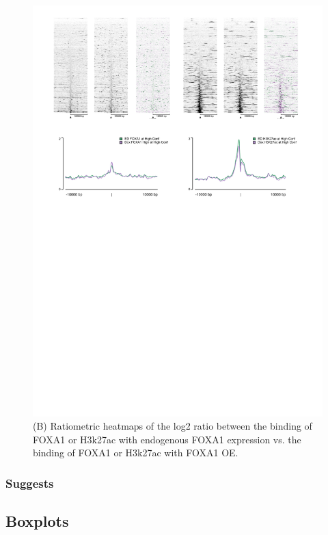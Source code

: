 \documentclass[
  12pt,
]{article}
\begin{document}
\begin{figure}

{\centering \includegraphics[width=24.54in]{../images/results_01} 

}

\caption{(B) Ratiometric heatmaps of the log2 ratio between the binding of FOXA1 or H3k27ac with endogenous FOXA1 expression vs. the binding of FOXA1 or H3k27ac with FOXA1 OE.}\label{fig:results-1}
\end{figure}

\hypertarget{suggests}{%
\subsubsection{Suggests}\label{suggests}}

\hypertarget{boxplots}{%
\subsection{Boxplots}\label{boxplots}}
\end{document}
